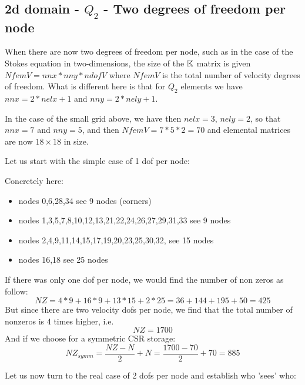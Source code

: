 \subsection{2d domain - $Q_2$ - Two degrees of freedom per node}


When there are now two degrees of freedom per node, such as in the case 
of the Stokes equation in two-dimensions, the size of the ${\mathbb{K}}$ matrix 
is given $NfemV=nnx*nny*ndofV$ where $NfemV$ is the total number of 
velocity degrees of freedom. What is different here is that for $Q_2$
elements we have $nnx=2*nelx+1$ and $nny=2*nely+1$.

\begin{center}

\end{center}

In the case of the small grid above, we have then 
$nelx=3$, $nely=2$, so that $nnx=7$ and $nny=5$, and then
$NfemV=7*5*2=70$ and elemental matrices are now $18\times18$ in size.


Let us start with the simple case of 1 dof per node:
\begin{center}

\end{center}

Concretely here:
\begin{itemize}
\item nodes {\color{teal} 0,6,28,34} see 9 nodes (corners)
\item nodes 1,3,5,7,8,10,12,13,21,22,24,26,27,29,31,33 see 9 nodes
\item nodes 2,4,9,11,14,15,17,19,20,23,25,30,32, see 15 nodes
\item nodes 16,18 see 25 nodes
\end{itemize}

If there was only one dof per node, we would find 
the number of non zeros as follow:
\[
NZ=4*9 + 16*9 + 13*15 + 2*25 = 36+144 + 195 + 50 = 425
\]
But since there are two velocity dofs per node, we find that 
the total number of nonzeros is 4 times higher, i.e.
\[
NZ=1700
\] 
And if we choose for a symmetric CSR storage:
\[
NZ_{symm} = \frac{NZ-N}{2}+N = \frac{1700-70}{2} + 70 = 885 
\]

Let us now turn to the real case of 2 dofs per node and establish who 'sees' who:

